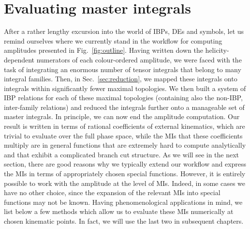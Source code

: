 \documentclass[main.tex]{subfiles}
\begin{document}
\section{Evaluating master integrals}
After a rather lengthy excursion into the world of IBPs, DEs and symbols, let us remind ourselves where we currently stand in the workflow for computing amplitudes presented in Fig.~\ref{fig:outline}. Having written down the helicity-dependent numerators of each colour-ordered amplitude, we were faced with the task of integrating an enormous number of tensor integrals that belong to many integral families. Then, in Sec.~\ref{sec:reduction}, we mapped these integrals onto integrals within significantly fewer maximal topologies. We then built a system of IBP relations for each of these maximal topologies (containing also the non-IBP, inter-family relations) and reduced the integrals further onto a manageable set of master integrals. In principle, we can now end the amplitude computation. Our result is written in terms of rational coefficients of external kinematics, which are trivial to evaluate over the full phase space, while the MIs that these coefficients multiply are in general functions that are extremely hard to compute analytically and that exhibit a complicated branch cut structure. As we will see in the next section, there are good reasons why we typically extend our workflow and express the MIs in terms of appropriately chosen special functions. However, it is entirely possible to work with the amplitude at the level of MIs. Indeed, in some cases we have no other choice, since the expansion of the relevant MIs into special functions may not be known. Having phenomenological applications in mind, we list below a few methods which allow us to evaluate these MIs numerically at chosen kinematic points. In fact, we will use the last two in subsequent chapters.
\end{document}
